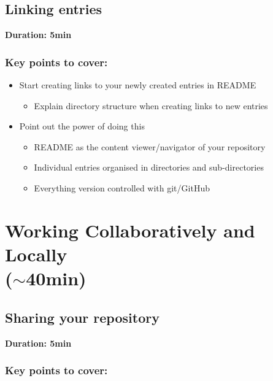 \documentclass[a4paper, 12pt, oneside]{report} %
\begin{document}
\section{Linking entries}
\label{sec:linking_entries}

{\bfseries Duration: 5min}

\subsection*{Key points to cover:}

\begin{itemize}
	\item Start creating links to your newly created entries in README
		\begin{itemize}
			\item Explain directory structure when creating links to new entries
		\end{itemize}
	\item Point out the power of doing this
		\begin{itemize}
			\item README as the content viewer/navigator of your repository
			\item Individual entries organised in directories and sub-directories
			\item Everything version controlled with git/GitHub
		\end{itemize}
\end{itemize}


\chapter{Working Collaboratively and Locally\\($\sim$40min)}
\label{cha:working_collaboratively_and_locally}

\section{Sharing your repository}
\label{sec:sharing_your_repository}

{\bfseries Duration: 5min}

\subsection*{Key points to cover:}
\end{document}
